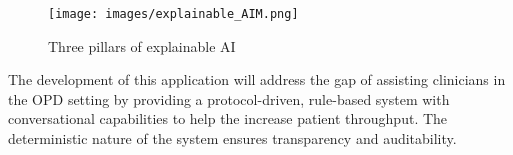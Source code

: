 \begin{figure}[H]
    \centering
    \texttt{[image: images/explainable\_AIM.png]}
    \caption{Three pillars of explainable AI}
    \label{fig:explainable_AIM}
\end{figure}

\noindent The development of this application will address the gap of assisting clinicians in the OPD setting by providing a protocol-driven, rule-based system with conversational capabilities to help the increase patient throughput. The deterministic nature of the system ensures transparency and auditability.